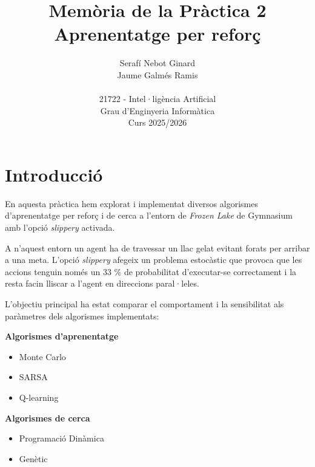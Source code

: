 \documentclass[12pt,a4paper]{report}
\title{
  \vspace{0cm}
  \textbf{Memòria de la Pràctica 2}\\
  {\Large \textbf{Aprenentatge per reforç}}
  \vspace{5cm}
}
\author{Serafí Nebot Ginard \\  Jaume Galmés Ramis \\
\vspace{7cm}
\\ 21722 - Intel·ligència Artificial \\ Grau d'Enginyeria Informàtica \\ Curs 2025/2026
}
\begin{document}
\date{}  %
\maketitle
\thispagestyle{empty}
\newpage
\titlespacing*{\chapter}{0pt}{0pt}{20pt}  

\renewcommand{\contentsname}{Índex}
\tableofcontents
\newpage


\chapter{Introducció}
\label{ch:intro}

En aquesta pràctica hem explorat i implementat diversos algorismes d'aprenentatge per reforç i de cerca a
l'entorn de \textit{Frozen Lake} de Gymnasium amb l'opció \textit{slippery} activada.

A n'aquest entorn un agent ha de travessar un llac gelat evitant forats per arribar a una
meta. L'opció \textit{slippery} afegeix un problema estocàstic que provoca que les accions tenguin només un
33 \% de probabilitat d'executar-se correctament i la resta facin lliscar a l'agent en direccions paral·leles.

L'objectiu principal ha estat comparar el comportament i la sensibilitat als paràmetres dels algorismes
implementats:

\begin{minipage}[t]{0.48\textwidth}
  \textbf{Algorismes d'aprenentatge}
  \begin{itemize}
    \item Monte Carlo
    \item SARSA
    \item Q-learning
  \end{itemize}
\end{minipage}
\hfill
\begin{minipage}[t]{0.48\textwidth}
  \textbf{Algorismes de cerca}
  \begin{itemize}
    \item Programació Dinàmica
    \item Genètic
  \end{itemize}
\end{minipage}\\
\end{document}
